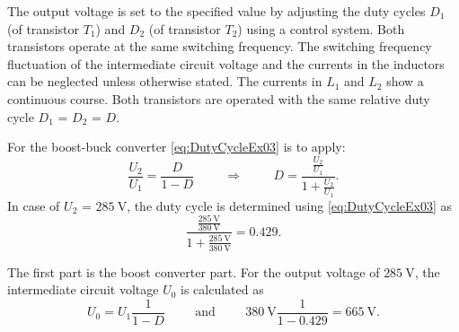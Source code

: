 \par

\par


The output voltage is set to the specified value by adjusting the duty cycles $D_\mathrm{1}$ (of transistor $T_\mathrm{1}$) 
and $D_\mathrm{2}$ (of transistor $T_\mathrm{2}$) using a control system. Both transistors operate at the same switching frequency. 
The switching frequency fluctuation of the intermediate circuit voltage and the currents in the inductors can be neglected unless otherwise stated. 
The currents in $L_\mathrm{1}$ and $L_\mathrm{2}$ show a continuous course. Both transistors are operated with the 
same relative duty cycle $D_\mathrm{1}$ = $D_\mathrm{2}$ = $D$.


\begin{solutionblock}
    For the boost-buck converter \eqref{eq:DutyCycleEx03} is to apply:
    \begin{equation}
        \frac{U_\mathrm{2}}{U_\mathrm{1}} = \frac{D} {1-D}
        \hspace{1cm} \Rightarrow \hspace{1cm}
        D = \frac{\frac{U_\mathrm{2}}{U_\mathrm{1}}} {1+{\frac{U_\mathrm{2}}{U_\mathrm{1}}}}.
        \label{eq:DutyCycleEx03}
    \end{equation}
    In case of $U_\mathrm{2}$ = $\SI{285}{\volt}$, the duty cycle is determined using \eqref{eq:DutyCycleEx03} as
    \begin{equation}
       \frac{\frac{\SI{285}{\volt}}{\SI{380}{\volt}}} {1+{\frac{\SI{285}{\volt}}{\SI{380}{\volt}}}} = 0.429.
    \end{equation}
\end{solutionblock}



\begin{solutionblock}
    The first part is the boost converter part. For the output voltage 
    of $\SI{285}{\volt}$, the intermediate circuit voltage $U_\mathrm{0}$ is calculated as
    \begin{equation}
        U_\mathrm{0}=U_\mathrm{1} \frac{1}{1-D} 
        \hspace{1cm} \mathrm{and} \hspace{1cm}  
        \SI{380}{\volt} \frac{1}{1-0.429} = \SI{665}{\volt}.
        \label{eq:DCLinkEx03}        
    \end{equation}
\end{solutionblock}


